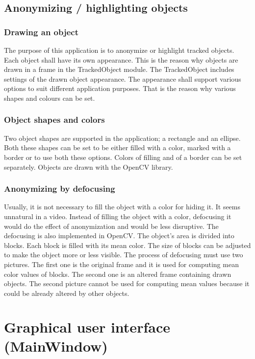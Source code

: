\section{Anonymizing / highlighting objects}
\subsection{Drawing an object}
The purpose of this application is to anonymize or highlight tracked objects. Each object shall have its own appearance. This is the reason why objects are drawn in a frame in the TrackedObject module. The TrackedObject includes settings of the drawn object appearance. The appearance shall support various options to suit different application purposes. That is the reason why various shapes and colours can be set.

\subsection{Object shapes and colors}
Two object shapes are supported in the application; a rectangle and an ellipse. Both these shapes can be set to be either filled with a color, marked with a border or to use both these options. Colors of filling and of a border can be set separately. Objects are drawn with the OpenCV library.

\subsection{Anonymizing by defocusing}
Usually, it is not necessary to fill the object with a color for hiding it. It seems unnatural in a video. Instead of filling the object with a color, defocusing it would do the effect of anonymization and would be less disruptive. The defocusing is also implemented in OpenCV. The object's area is divided into blocks. Each block is filled with its mean color. The size of blocks can be adjusted to make the object more or less visible. The process of defocusing must use two pictures. The first one is the original frame and it is used for computing mean color values of blocks. The second one is an altered frame containing drawn objects. The second picture cannot be used for computing mean values because it could be already altered by other objects.

\chapter{Graphical user interface (MainWindow)}\label{ch:gui}
